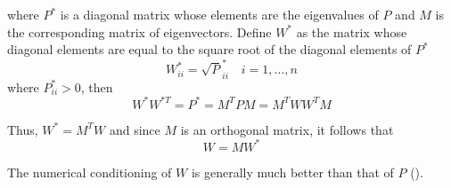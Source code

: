 where \(P^*\) is a diagonal matrix whose elements are the eigenvalues of \(P\) and 
\(M\) is the corresponding matrix of eigenvectors. Define \(W^*\) as the matrix 
whose diagonal elements are equal to the square root of the diagonal elements of \(P^*\)
\begin{equation}
  W^*_{ii} = \sqrt P^*_{ii} \quad i=1,\ldots ,n
\end{equation}
where \(P^*_{ii} > 0\), then
\begin{equation}
 W^* W^{*T} = P^* = M^T P M = M^T W W^T M
\end{equation}

Thus, \(W^* = M^T W \) and since \(M\) is an orthogonal matrix, it follows that
\begin{equation}
  \label{eq:tapley574}
  W = M W^*
\end{equation}

The numerical conditioning of \(W\) is generally much better than that of \(P\) (\cite{tapley}).
